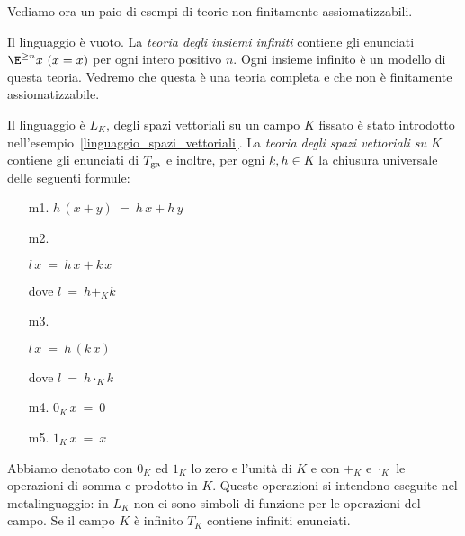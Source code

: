 Vediamo ora un paio di esempi di teorie non finitamente assiomatizzabili. 

\begin{example}
Il linguaggio \`e vuoto. La \emph{teoria degli insiemi infiniti\/} contiene gli enunciati $\E^{\ge n} x\ (x=x)$ per ogni intero positivo $n$. Ogni insieme infinito \`e un modello di questa teoria. Vedremo che questa \`e una teoria completa e che non \`e finitamente assiomatizzabile.\QED
\end{example}

\begin{example}
Il linguaggio \`e $L_K$, degli spazi vettoriali su un campo $K$ fissato \`e stato introdotto nell'esempio~\ref{linguaggio_spazi_vettoriali}. La \emph{teoria degli spazi vettoriali su $K$\/} contiene gli enunciati di $T_{\rm ga}$ e inoltre, per ogni $k,h\in K$ la chiusura universale delle seguenti formule:
\begin{itemize}
\item[m1.] $h\,(x+y)\ =\ h\,x+h\,y$
\item[m2.] \parbox{25ex}{$l\,x\ =\ h\,x+k\,x$} dove $l\ =\ h+_Kk$
\item[m3.] \parbox{25ex}{$l\,x\ =\ h\,(k\,x)$} dove $l\ =\ h\cdot_Kk$
\item[m4.] $0_K\,x\ =\ 0$
\item[m5.] $1_K\,x\ =\ x$
\end{itemize}
Abbiamo denotato con $0_K$ ed $1_K$ lo zero e l'unit\`a di $K$ e con $+_K$ e $\cdot_K$ le operazioni di somma e prodotto in $K$. Queste operazioni si intendono eseguite nel metalinguaggio: in $L_K$ non ci sono simboli di funzione per le operazioni del campo. Se il campo $K$ \`e infinito $T_K$ contiene infiniti enunciati.\QED
\end{example}


% 


